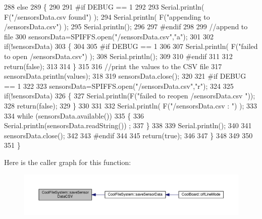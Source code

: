\begin{DoxyCode}
288     \textcolor{keywordflow}{else}
289     \{
290 
291 \textcolor{preprocessor}{    #if DEBUG == 1}
292     
293         Serial.println( F(\textcolor{stringliteral}{"/sensorsData.csv  found"}) );
294         Serial.println( F(\textcolor{stringliteral}{"appending to /sensorsData.csv"}) );
295         Serial.println();
296     
297 \textcolor{preprocessor}{    #endif}
298 
299         \textcolor{comment}{//append to file}
300         sensorsData=SPIFFS.open(\textcolor{stringliteral}{"/sensorsData.csv"},\textcolor{stringliteral}{"a"});
301         
302         \textcolor{keywordflow}{if}(!sensorsData)
303         \{
304         
305 \textcolor{preprocessor}{        #if DEBUG == 1}
306             
307             Serial.println( F(\textcolor{stringliteral}{"failed to open /sensorsData.csv"}) );
308             Serial.println();
309 
310 \textcolor{preprocessor}{        #endif}
311             
312             \textcolor{keywordflow}{return}(\textcolor{keyword}{false});
313         
314         \}
315 
316         \textcolor{comment}{//print the values to the CSV file}
317         sensorsData.println(values);
318         
319         sensorsData.close();
320 
321 \textcolor{preprocessor}{    #if DEBUG == 1}
322 
323         sensorsData=SPIFFS.open(\textcolor{stringliteral}{"/sensorsData.csv"},\textcolor{stringliteral}{"r"});
324         
325         \textcolor{keywordflow}{if}(!sensorsData)
326         \{
327             Serial.println(F(\textcolor{stringliteral}{"failed to reopen /sensorsData.csv "}));
328             \textcolor{keywordflow}{return}(\textcolor{keyword}{false});      
329         \}
330 
331         
332         Serial.println( F(\textcolor{stringliteral}{"/sensorsData.csv : "}) );
333 
334         \textcolor{keywordflow}{while} (sensorsData.available()) 
335         \{
336             Serial.println(sensorsData.readString()) ;
337         \}
338         
339         Serial.println();
340         
341         sensorsData.close();
342         
343 \textcolor{preprocessor}{    #endif      }
344         
345         \textcolor{keywordflow}{return}(\textcolor{keyword}{true});
346     
347     \}   
348 
349 
350 
351 \}
\end{DoxyCode}
Here is the caller graph for this function\+:\nopagebreak
\begin{figure}[H]
\begin{center}
\leavevmode
\includegraphics[width=350pt]{classCoolFileSystem_ab78704d5d21ce10fc6f1138ab5ab46c8_icgraph}
\end{center}
\end{figure}
\mbox{\label{classCoolFileSystem_adfa8e2e80641ae6f0cceabd348a9b841}} 
